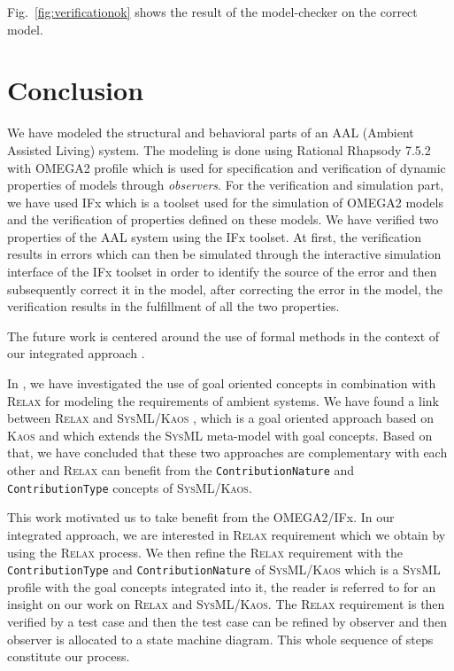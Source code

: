 \documentclass[a4paper,twoside]{article}
\def\myrelax{\textsc{Relax}}                  %
\def\sysml{\textsc{SysML}}
\def\kaos{\textsc{Kaos}}
\begin{document}
Fig.~\ref{fig:verificationok} shows the result of the model-checker on the correct model.

\section{{Conclusion}
\label{sec:conclusion}}
\noindent We have modeled the structural and behavioral parts of an AAL (Ambient Assisted Living) system. The modeling is done using Rational Rhapsody 7.5.2  with OMEGA2 profile which is used for specification and verification of dynamic properties of models through \textit{observers}. For the verification and simulation part, we have used IFx which is a toolset used for the simulation of OMEGA2 models and the verification of properties defined on these models. We have verified two properties of the AAL system using the IFx toolset. At first, the verification results in errors which can then be simulated through the interactive simulation interface of the IFx toolset in order to identify the source of the error and then subsequently correct it in the model, after correcting the error in the model, the verification results in the fulfillment of all the two properties. 

The future work is centered around the use of formal methods in the context of our integrated approach \cite{test18}. 

In \cite{test7}, we have investigated the use of goal oriented concepts in combination with \myrelax{} for modeling the requirements of ambient systems. We have found a link between \myrelax{} and \sysml{}/\kaos{} \cite{test8}, which is a goal oriented approach based on \kaos{} and which extends the \sysml{} meta-model with goal concepts. Based on that, 
we have concluded that these two approaches are complementary with each other and \myrelax{} can benefit from the \texttt{ContributionNature} and \texttt{ContributionType} concepts of \sysml{}/\kaos{}. 

This work motivated us to take benefit from the OMEGA2/IFx. In our integrated approach, we are interested in \myrelax{} requirement which we obtain by using the \myrelax{} process. We then refine the \myrelax{} requirement with the \texttt{ContributionType} and \texttt{ContributionNature} of \sysml{}/\kaos{} which is a \sysml{} profile with the goal concepts integrated into it, the reader is referred to \cite{test7} for an insight on our work on \myrelax{} and \sysml{}/\kaos{}. The \myrelax{} requirement is then verified by a test case and then the test case can be refined by observer and then observer is allocated to a state machine diagram. This whole sequence of steps constitute our process.
\end{document}
